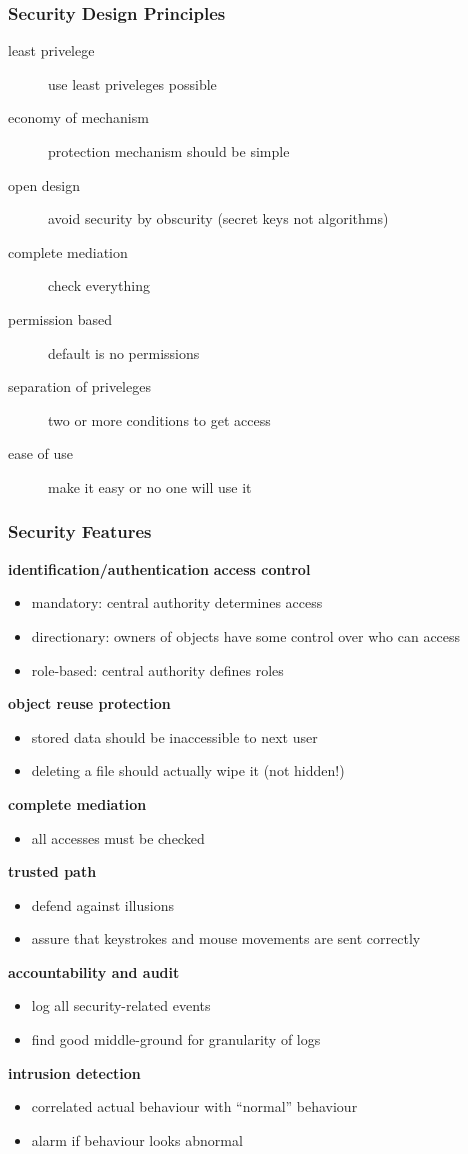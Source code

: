 \documentclass[]{article}
\theoremstyle{definition}
\begin{document}
	\subsubsection{Security Design Principles}
	\begin{description}
		\item[least privelege] use least priveleges possible
		\item[economy of mechanism] protection mechanism should be simple
		\item[open design] avoid security by obscurity (secret keys not algorithms)
		\item[complete mediation] check everything
		\item[permission based] default is no permissions
		\item[separation of priveleges] two or more conditions to get access
		\item[ease of use] make it easy or no one will use it
	\end{description}

	\subsubsection{Security Features}
	\textbf{identification/authentication}
	\textbf{access control}
	\begin{itemize}
		\item mandatory: central authority determines access
		\item directionary: owners of objects have some control over who can access
		\item role-based: central authority defines roles
	\end{itemize}
	\textbf{object reuse protection}
	\begin{itemize}
		\item stored data should be inaccessible to next user
		\item deleting a file should actually wipe it (not hidden!)
	\end{itemize}
	\textbf{complete mediation}
	\begin{itemize}
		\item all accesses must be checked
	\end{itemize}
	\textbf{trusted path}
	\begin{itemize}
		\item defend against illusions
		\item assure that keystrokes and mouse movements are sent correctly
	\end{itemize}
	\textbf{accountability and audit}
	\begin{itemize}
		\item log all security-related events
		\item find good middle-ground for granularity of logs
	\end{itemize}
	\textbf{intrusion detection}
	\begin{itemize}
		\item correlated actual behaviour with ``normal'' behaviour
		\item alarm if behaviour looks abnormal
	\end{itemize}
\end{document}
